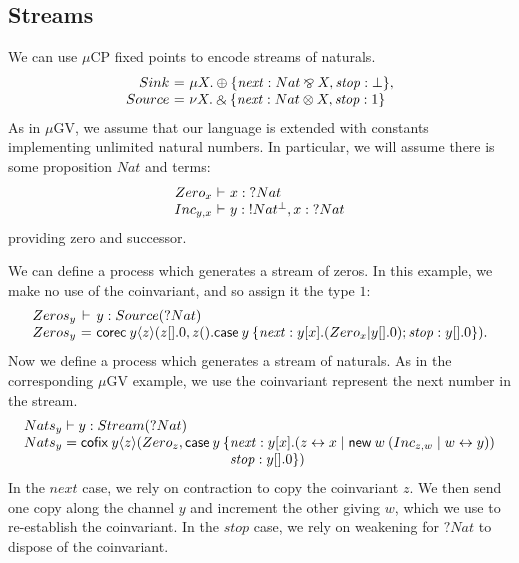 \documentclass[orivec,envcountsame]{llncs}
\makeatletter
\newcommand{\with}{\mathbin\binampersand}
\newcommand{\parr}{\mathbin\bindnasrepma}
\newcommand{\cpdual}[1]{#1^\perp}
\newcommand{\cpbang}[1]{{! #1}}
\newcommand{\cpquery}[1]{{? #1}}
\newcommand{\mkwd}[1]{\mathsf{#1}}
\newcommand{\link}[2]{#1 \leftrightarrow #2}
\newcommand{\cut}[4]{\mkwd{new}\:#1 \: (#3 \mid #4)}
\newcommand{\corec}[4]{\mkwd{corec}\:{#1} \langle #2 \rangle (#3,#4)}
\newcommand{\clabel}[1]{\mathit{#1}}
\renewcommand{\case}[2]{\mkwd{case}\:#1\:\{#2\}}
\newcommand{\lrkwd}{\mkwd{cofix}}
\newcommand{\key}{\mkwd}
\newcommand{\mucp}{$\mu\mathrm{CP}$\xspace}
\newcommand{\mugv}{$\mu\mathrm{GV}$\xspace}
\newcommand{\ba}{\begin{array}}
\newcommand{\ea}{\end{array}}
\newcommand{\bl}{\ba[t]{@{}l@{}}}
\newcommand{\el}{\ea}
\newenvironment{equations}{\[\ba{@{}r@{~}c@{~}l@{}}}{\ea\]}
\newenvironment{eqs}{\ba{@{}r@{~}c@{~}l@{}}}{\ea}
\makeatother
\begin{document}
\subsection{Streams}

We can use \mucp fixed points to encode streams of naturals.
\begin{equations}
  Sink &=& \mu X. \oplus \{ \clabel{next}: Nat \parr X, \clabel{stop}: \bot \}, \\
  Source &=& \nu X. \with \{ \clabel{next}: Nat \otimes X, \clabel{stop}: 1 \} \\
\end{equations}%
As in \mugv, we assume that our language is extended with constants implementing unlimited
natural numbers. In particular, we will assume there is some proposition $Nat$ and terms:
\small\[
\begin{eqs}
Zero_x &\vdash& x:\cpquery{Nat} \\
Inc_{y,x} &\vdash& y:\cpbang{\cpdual{Nat}},x:\cpquery{Nat} \\
\end{eqs}
\]\normalsize
providing zero and successor.


We can define a process which generates a stream of zeros. In this example, we make no use of the
coinvariant, and so assign it the type $1$:
\small\[\begin{eqs}
  Zeros_y &\vdash& y:Source(\cpquery{Nat}) \\
  Zeros_y &=& \corec{y}{z}{z[].0}{z().\case{y}{\clabel{next}: y[x].(Zero_x | y[].0); \clabel{stop}: y[].0}}.
\end{eqs}\]\normalsize
Now we define a process which generates a stream of naturals. As in the corresponding \mugv example,
we use the coinvariant represent the next number in the stream.
%
\small\[
\bl
  Nats_y \vdash y:Stream(\cpquery{Nat}) \\
  Nats_y = \lrkwd \: y \langle z \rangle (Zero_z,
    \key{case}\:y \:\{
       \bl
       \clabel{next}: y[x].(\link{z}{x} \mid \cut{w}{}{Inc_{z,w}}{\link{w}{y}}) \\
       \clabel{stop}: y[].0\}) \\
       \el \\
\el
\]\normalsize
%
In the $\clabel{next}$ case, we rely on contraction to copy the coinvariant $z$.  We then send one
copy along the channel $y$ and increment the other giving $w$, which we use to re-establish the
coinvariant. In the $\clabel{stop}$ case, we rely on weakening for $\cpquery{Nat}$ to dispose of the
coinvariant.
\end{document}
